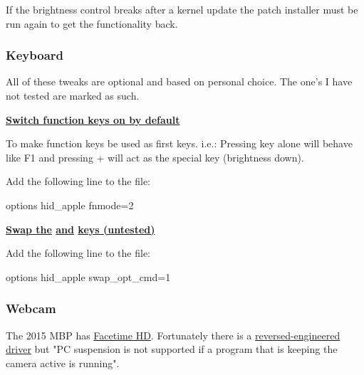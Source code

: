 If the brightness control breaks after a kernel update the patch installer must be run again to get the functionality back.

\subsubsection{Keyboard}

All of these tweaks are optional and based on personal choice. The one's I have not tested are marked as such.

\vspace*{1em}
\textbf{\textcolor{textgrey}{\uline{Switch function keys on by default}}}

To make function keys be used as first keys. i.e.: Pressing  key alone will behave like F1 and pressing + will act as the special key (brightness down).

\begin{blocksection}
	Add the following line to the file:
	\vspace*{1em}
	\begin{codeblock}
		options hid\_apple fnmode=2
	\end{codeblock}
\end{blocksection}

\vspace*{1em}
\textbf{\textcolor{textgrey}{\uline{Swap the}  \uline{and}  \uline{keys (untested)}}}

\begin{blocksection}
	Add the following line to the file:
	\vspace*{1em}
	\begin{codeblock}
		options hid\_apple swap\_opt\_cmd=1
	\end{codeblock}
\end{blocksection}

\subsubsection{Webcam}

The 2015 MBP has \href{https://wiki.archlinux.org/index.php/MacBook#Facetime_HD}{Facetime HD}.
Fortunately there is a \href{https://github.com/patjak/bcwc_pcie}{reversed-engineered driver} but "PC suspension is not supported if a 
program that is keeping the camera active is running".

